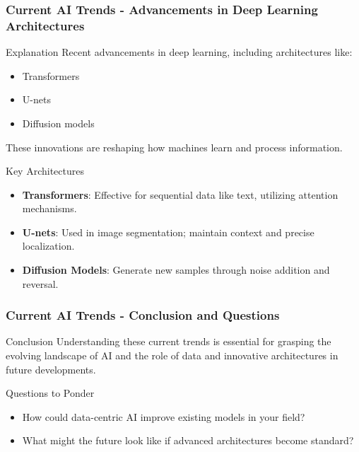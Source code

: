 \documentclass[aspectratio=169]{beamer}
\begin{document}
\begin{frame}[fragile]
    \frametitle{Current AI Trends - Advancements in Deep Learning Architectures}
    \begin{block}{Explanation}
        Recent advancements in deep learning, including architectures like:
        \begin{itemize}
            \item Transformers 
            \item U-nets
            \item Diffusion models
        \end{itemize}
        These innovations are reshaping how machines learn and process information.
    \end{block}

    \begin{block}{Key Architectures}
        \begin{itemize}
            \item \textbf{Transformers}: Effective for sequential data like text, utilizing attention mechanisms.
            \item \textbf{U-nets}: Used in image segmentation; maintain context and precise localization.
            \item \textbf{Diffusion Models}: Generate new samples through noise addition and reversal.
        \end{itemize}
    \end{block}
\end{frame}

\begin{frame}[fragile]
    \frametitle{Current AI Trends - Conclusion and Questions}
    \begin{block}{Conclusion}
        Understanding these current trends is essential for grasping the evolving landscape of AI and the role of data and innovative architectures in future developments.
    \end{block}

    \begin{block}{Questions to Ponder}
        \begin{itemize}
            \item How could data-centric AI improve existing models in your field?
            \item What might the future look like if advanced architectures become standard?
        \end{itemize}
    \end{block}
\end{frame}
\end{document}

